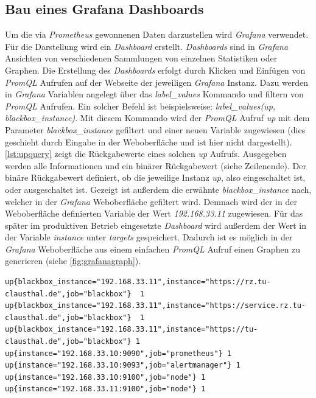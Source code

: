 \documentclass[titlepage]{report}
\begin{document}
\subsection{Bau eines Grafana Dashboards}
Um die via \emph{Prometheus} gewonnenen Daten darzustellen wird
\emph{Grafana} verwendet. Für die Darstellung wird ein \emph{Dashboard}
erstellt. \emph{Dashboards} sind in \emph{Grafana} Ansichten von
verschiedenen Sammlungen von einzelnen Statistiken oder Graphen. Die
Erstellung des \emph{Dashboards} erfolgt durch Klicken und Einfügen von
\emph{PromQL} Aufrufen auf der Webseite der jeweiligen \emph{Grafana} Instanz.
Dazu werden in \emph{Grafana} Variablen angelegt über das
\emph{label\_values} Kommando und filtern von \emph{PromQL} Aufrufen. Ein
solcher Befehl ist beispielsweise:
\emph{label\_values(up, blackbox\_instance)}. Mit diesem Kommando wird der
\emph{PromQL} Aufruf \emph{up} mit dem Parameter
\emph{blackbox\_instance} gefiltert und einer neuen Variable zugewiesen
(dies geschieht durch Eingabe in der Weboberfläche und ist hier nicht
dargestellt). \autoref{lst:upquery} zeigt die Rückgabewerte eines
solchen \emph{up} Aufrufs. Ausgegeben werden alle Informationen und ein
binärer Rückgabewert (siehe Zeilenende). Der binäre Rückgabewert
definiert, ob die jeweilige Instanz \emph{up}, also eingeschaltet ist,
oder ausgeschaltet ist. Gezeigt ist außerdem die erwähnte
\emph{blackbox\_instance} nach, welcher in der \emph{Grafana}
Weboberfläche gefiltert wird. Demnach wird der in der Weboberfläche
definierten Variable der Wert \emph{192.168.33.11} zugewiesen. Für das
später im produktiven Betrieb eingesetzte \emph{Dashboard} wird außerdem
der Wert in der Variable \emph{instance} unter \emph{targets}
gespeichert. Dadurch ist es möglich in der \emph{Grafana} Weboberfläche
aus einem einfachen \emph{PromQL} Aufruf einen Graphen zu generieren
(siehe \autoref{fig:grafanagraph}).
\begin{minipage}{\linewidth}
\begin{lstlisting}[caption={Rückgabewerte des up-Aufrufs in
PromQL},label={lst:upquery}]
up{blackbox_instance="192.168.33.11",instance="https://rz.tu-clausthal.de",job="blackbox"}	1
up{blackbox_instance="192.168.33.11",instance="https://service.rz.tu-clausthal.de",job="blackbox"}	1
up{blackbox_instance="192.168.33.11",instance="https://tu-clausthal.de",job="blackbox"}	1
up{instance="192.168.33.10:9090",job="prometheus"} 1
up{instance="192.168.33.10:9093",job="alertmanager"} 1
up{instance="192.168.33.10:9100",job="node"} 1
up{instance="192.168.33.11:9100",job="node"} 1
\end{lstlisting}
\end{minipage}
\end{document}
